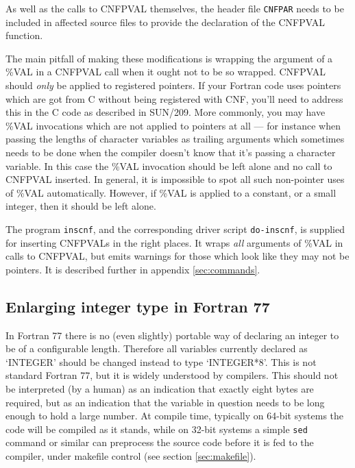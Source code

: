 \documentclass[twoside,11pt]{article}
\newcommand{\htmlref}[2]{#1}
\newcommand{\latexhtml}[2]{#1}
\newcommand{\xref}[3]{#1}
\renewcommand{\_}{\texttt{\symbol{95}}}
\newcommand{\xroutine}[1]{\htmlref{{\tt #1}}{#1}}
\newcommand{\xdofilter}[1]{\htmlref{{\tt do-#1}}{do-xxx}}
\newcommand{\file}[1]{{\tt #1}}
\begin{document}
As well as the calls to CNF\_PVAL themselves, 
the header file \file{CNF\_PAR} needs to be included
in affected source files to provide the declaration of the CNF\_PVAL function.

The main pitfall of making these modifications is
wrapping the argument of a \%VAL in a CNF\_PVAL call when it ought
not to be so wrapped.
CNF\_PVAL should {\em only\/} be applied to registered pointers.
If your Fortran code uses pointers which are got from C without 
being registered with CNF, you'll need to address this in the C code 
as described in \xref{SUN/209}{sun209}{pointers}.
More commonly, you may have \%VAL invocations which are not
applied to pointers at all --- for instance when passing 
the lengths of character variables as trailing arguments 
which sometimes needs to be done when the compiler doesn't know that
it's passing a character variable.  In this case the \%VAL 
invocation should be left alone and no call to CNF\_PVAL inserted.
In general, it is impossible to spot all such non-pointer uses
of \%VAL automatically.  However, if \%VAL is applied to a constant,
or a small integer, then it should be left alone.

The program \xroutine{inscnf}, and the corresponding driver script 
\xdofilter{inscnf}, is supplied for inserting CNF\_PVALs
in the right places.  It wraps {\em all\/} arguments of \%VAL 
in calls to CNF\_PVAL, but emits warnings for those which look like
they may not be pointers.
It is described further in
\latexhtml{appendix \ref{sec:commands}}{\htmlref{the appendix}{inscnf}}.

\subsection{Enlarging integer type in Fortran 77\label{sec:fint}}


In Fortran 77 there is no (even slightly) portable way of declaring
an integer to be of a configurable length. 
Therefore all variables currently declared as `INTEGER' 
should be changed instead to type `INTEGER*8'. 
This is not standard Fortran 77, but it is widely understood by compilers.
This should not be interpreted (by a human) as an indication that exactly
eight bytes are required, but as an indication that 
the variable in question needs to be
long enough to hold a large number.
At compile time, typically on 64-bit systems the code will be compiled
as it stands, while on 32-bit systems a simple \file{sed} command or similar
can preprocess the source code before it is fed to the compiler,
under makefile control (see section \ref{sec:makefile}).
\end{document}
